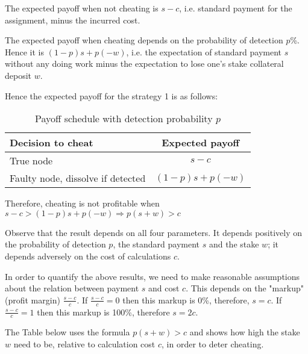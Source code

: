 \documentclass[conference]{IEEEtran}
\begin{document}
The expected payoff when not cheating is $s-c$, i.e. standard payment for the assignment, minus the incurred cost.

The expected payoff when cheating depends on the probability of detection $p$\%. Hence it is $(1-p)s+p(-w)$, i.e. the expectation of standard payment $s$ without any doing work minus the expectation to lose one's stake collateral deposit $w$.

Hence the expected payoff for the strategy 1 is as follows:

\begin{table}[ht]
    \caption{Payoff schedule with detection probability $p$}
    \label{table:advpayoff}
    \begin{adjustbox}{center}
        \begin{tabular}{l c}
            \toprule
            Decision to cheat & Expected payoff \\
            \midrule
            True node & $s-c$ \\
            Faulty node, dissolve if detected & $(1-p)s+p(-w)$ \\
            \bottomrule
        \end{tabular}
    \end{adjustbox}
\end{table}

Therefore, cheating is not profitable when $s-c>(1-p)s+p(-w) \Longrightarrow p(s+w)>c$

Observe that the result depends on all four parameters. It depends positively on the probability of detection $p$, the standard payment $s$ and the stake $w$; it depends adversely on the cost of calculations $c$.

In order to quantify the above results, we need to make reasonable assumptions about the relation between payment $s$ and cost $c$. This depends on the "markup" (profit margin) $\frac{s-c}{c}$. If $\frac{s-c}{c}=0$ then this markup is 0\%, therefore, $s=c$. If $\frac{s-c}{c}=1$ then this
markup is 100\%, therefore $s=2c$.

The Table below uses the formula $p(s+w)>c$ and shows how high the stake $w$ need to be, relative to calculation cost $c$, in order to deter cheating.
\end{document}
